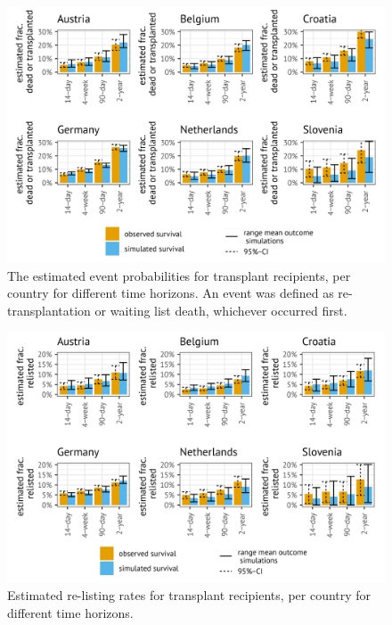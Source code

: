\documentclass[11pt,twoside,]{book}
\begin{document}
\begin{figure}[ht]

{\centering \includegraphics[width=0.9\linewidth]{figures/ch5//fig2-post_txp_event_rates} 

}

\caption{The estimated event probabilities for transplant recipients, per country for different time horizons. An event was defined as re-transplantation or waiting list death, whichever occurred first.}\label{fig:ch5fig2}
\end{figure}

\FloatBarrier

\begin{figure}[ht]

{\centering \includegraphics[width=0.9\linewidth]{figures/ch5//sfig1-post_txp_relisting_rates} 

}

\caption{Estimated re-listing rates for transplant recipients, per country for different time horizons.}\label{fig:ch5sfig1}
\end{figure}
\end{document}
